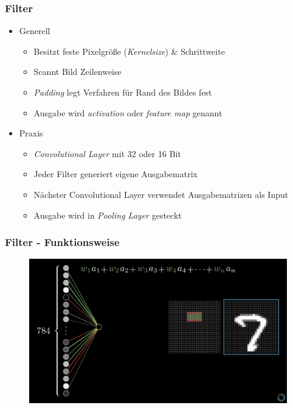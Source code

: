 \begin{frame}
\frametitle{Filter}


\begin{itemize}
\item Generell

\begin{itemize}
	\item Besitzt feste Pixelgröße (\emph{Kernelsize}) \& Schrittweite
	\item Scannt Bild Zeilenweise
	\item \emph{Padding} legt Verfahren für Rand des Bildes fest
	\item Ausgabe wird \emph{activation} oder \emph{feature map} genannt
\end{itemize}

\item Praxis
\begin{itemize}
	\item \emph{Convolutional Layer} mit 32 oder 16 Bit
	\item Jeder Filter generiert eigene Ausgabematrix
	\item Nächster Convolutional Layer verwendet Ausgabematrizen als Input
	\item Ausgabe wird in \emph{Pooling Layer} gesteckt
\end{itemize}

\end{itemize}



\end{frame}


\begin{frame}
\frametitle{Filter - Funktionsweise}

\begin{figure}
	\includegraphics[width=\linewidth]{./geschichtliches/convolutionalNN/img/filter}
\end{figure}
\end{frame}



